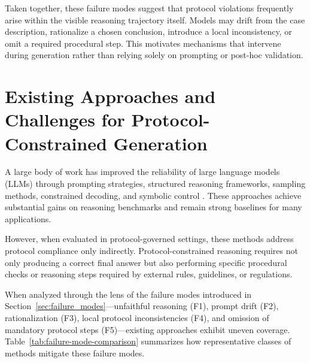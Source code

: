 \documentclass[twocolumn]{article}
\begin{document}
Taken together, these failure modes suggest that protocol violations frequently
arise within the visible reasoning trajectory itself. Models may drift from the
case description, rationalize a chosen conclusion, introduce a local
inconsistency, or omit a required procedural step. This motivates mechanisms
that intervene during generation rather than relying solely on prompting or
post-hoc validation.

\section{Existing Approaches and Challenges for Protocol\hyp{}Constrained
Generation}

A large body of work has improved the reliability of large language models
(LLMs) through prompting strategies, structured reasoning frameworks, sampling
methods, constrained decoding, and symbolic control
\parencite{wei2022cot,yao2023react,wang2023selfconsistency,
zhou2025structured,liu2023trustworthy,zhao2024ctg}. These approaches achieve
substantial gains on reasoning benchmarks and remain strong baselines for many
applications.

However, when evaluated in protocol-governed settings, these methods address
protocol compliance only indirectly. Protocol-constrained reasoning requires not
only producing a correct final answer but also performing specific procedural
checks or reasoning steps required by external rules, guidelines, or
regulations.

When analyzed through the lens of the failure modes introduced in
Section~\ref{sec:failure_modes}---unfaithful reasoning (F1), prompt drift (F2),
rationalization (F3), local protocol inconsistencies (F4), and omission of
mandatory protocol steps (F5)---existing approaches exhibit uneven coverage.
Table~\ref{tab:failure-mode-comparison} summarizes how representative classes of
methods mitigate these failure modes.
\end{document}
